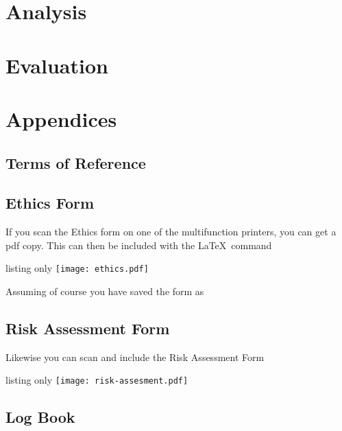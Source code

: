 \documentclass[10pt,twoside]{book}
\begin{document}
\frontmatter




\tableofcontents

\mainmatter

\part{Analysis}


\part{Evaluation}


\printbibliography
\part{Appendices}
\appendix
\chapter{Terms of Reference}
\chapter{Ethics Form}
If you scan the Ethics form on one of the multifunction printers, you can get a pdf copy.  This can then be included with the \LaTeX\ command
\begin{tcblisting}{listing only}
\texttt{[image: ethics.pdf]}
\end{tcblisting}
Assuming of course you have saved the form  as 

\chapter{Risk Assessment Form}
Likewise you can scan and include the Risk Assessment Form
\begin{tcblisting}{listing only}
\texttt{[image: risk-assesment.pdf]}
\end{tcblisting}
\chapter{Log Book}

\end{document}
